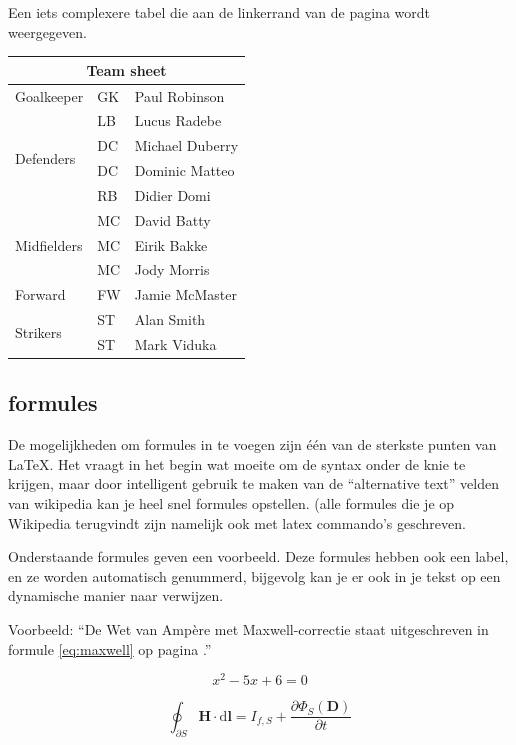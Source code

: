 Een iets complexere tabel die aan de linkerrand van de pagina wordt weergegeven.

\begin{flushleft}
\begin{tabular}{|l|l|l|}
\hline
\multicolumn{3}{|c|}{Team sheet} \\
\hline
Goalkeeper & GK & Paul Robinson \\ \hline
\multirow{4}{*}{Defenders} & LB & Lucus Radebe \\
 & DC & Michael Duberry \\
 & DC & Dominic Matteo \\
 & RB & Didier Domi \\ \hline
\multirow{3}{*}{Midfielders} & MC & David Batty \\
 & MC & Eirik Bakke \\
 & MC & Jody Morris \\ \hline
Forward & FW & Jamie McMaster \\ \hline
\multirow{2}{*}{Strikers} & ST & Alan Smith \\
 & ST & Mark Viduka \\
\hline
\end{tabular}
\end{flushleft}

\subsection{formules}

De mogelijkheden om formules in te voegen zijn \'e\'en van de sterkste punten van \LaTeX. 
Het vraagt in het begin wat moeite om de syntax onder de knie te krijgen, maar door intelligent gebruik te maken van de ``alternative text'' velden van wikipedia kan je heel snel formules opstellen.
(alle formules die je op Wikipedia terugvindt zijn namelijk ook met latex commando's geschreven.

Onderstaande formules geven een voorbeeld. Deze formules hebben ook een label, en ze worden automatisch genummerd, bijgevolg kan je er ook in je tekst op een dynamische manier naar verwijzen.

Voorbeeld: ``De Wet van Amp\`ere met Maxwell-correctie staat uitgeschreven in formule \ref{eq:maxwell} op pagina \pageref{eq:maxwell}.''

\begin{equation} \label{eq:polynoom}
x^2 - 5 x + 6 = 0
\end{equation}

\begin{equation} \label{eq:maxwell}
\oint_{\partial S} \mathbf{H} \cdot \mathrm{d}\mathbf{l} = I_{f,S} + \frac {\partial \Phi_S(\mathbf D)}{\partial t} 
\end{equation}

